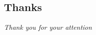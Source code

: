 \documentclass[compress]{thesisbeamer}
\begin{document}
        \subsection{Thanks}
        \begin{frame}
  			\centering \Large
  			\emph{Thank you for your attention}
        \end{frame}
        
\begin{frame}
	\printbibliography
\end{frame}
        	
\end{document}
